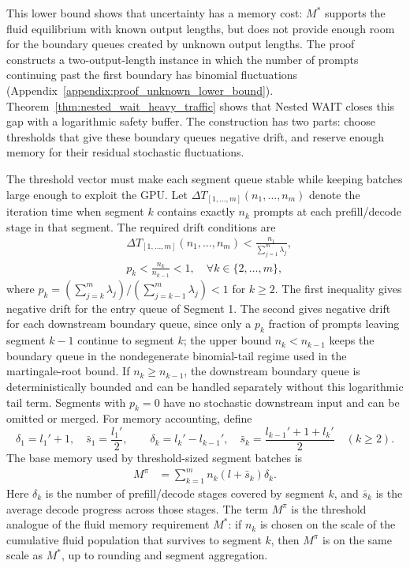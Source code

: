 This lower bound shows that uncertainty has a memory cost: \(M^*\) supports the fluid equilibrium with known output lengths, but does not provide enough room for the boundary queues created by unknown output lengths. The proof constructs a two-output-length instance in which the number of prompts continuing past the first boundary has binomial fluctuations (Appendix~\ref{appendix:proof_unknown_lower_bound}). Theorem~\ref{thm:nested_wait_heavy_traffic} shows that Nested WAIT closes this gap with a logarithmic safety buffer. The construction has two parts: choose thresholds that give these boundary queues negative drift, and reserve enough memory for their residual stochastic fluctuations.

The threshold vector must make each segment queue stable while keeping batches large enough to exploit the GPU. Let \(\Delta T_{[1,\dots,m]}(n_1,\dots,n_m)\) denote the iteration time when segment \(k\) contains exactly \(n_k\) prompts at each prefill/decode stage in that segment. The required drift conditions are
\begin{equation}
    \label{eq:nested_wait_thresholds}
    \begin{aligned}
    &\Delta T_{[1,\dots,m]}(n_1, \dots, n_m) <\frac{n_1}{\sum_{j=1}^m \lambda_j}, \\
    &p_k < \frac{n_k}{n_{k-1}} < 1,\quad \forall k \in \{2, \dots, m\},
    \end{aligned}
\end{equation}
where \(p_k = (\sum_{j=k}^m\lambda_j)/(\sum_{j=k-1}^m\lambda_j)<1\) for \(k\ge2\). The first inequality gives negative drift for the entry queue of Segment 1. The second gives negative drift for each downstream boundary queue, since only a \(p_k\) fraction of prompts leaving segment \(k-1\) continue to segment \(k\); the upper bound \(n_k<n_{k-1}\) keeps the boundary queue in the nondegenerate binomial-tail regime used in the martingale-root bound. If \(n_k\ge n_{k-1}\), the downstream boundary queue is deterministically bounded and can be handled separately without this logarithmic tail term. Segments with \(p_k=0\) have no stochastic downstream input and can be omitted or merged. For memory accounting, define
\[
\delta_1=l_1'+1,\quad \bar s_1=\frac{l_1'}{2},\qquad
\delta_k=l_k'-l_{k-1}',\quad \bar s_k=\frac{l_{k-1}'+1+l_k'}{2}\quad (k\ge2).
\]
The base memory used by threshold-sized segment batches is
\begin{equation}
    \label{eq:nested_wait_memory}
\begin{aligned}
        M^\pi &= \sum_{k=1}^m n_k (l+\bar s_k)\delta_k .
\end{aligned}
\end{equation}
Here \(\delta_k\) is the number of prefill/decode stages covered by segment \(k\), and \(\bar s_k\) is the average decode progress across those stages. The term \(M^\pi\) is the threshold analogue of the fluid memory requirement \(M^*\): if \(n_k\) is chosen on the scale of the cumulative fluid population that survives to segment \(k\), then \(M^\pi\) is on the same scale as \(M^*\), up to rounding and segment aggregation.

